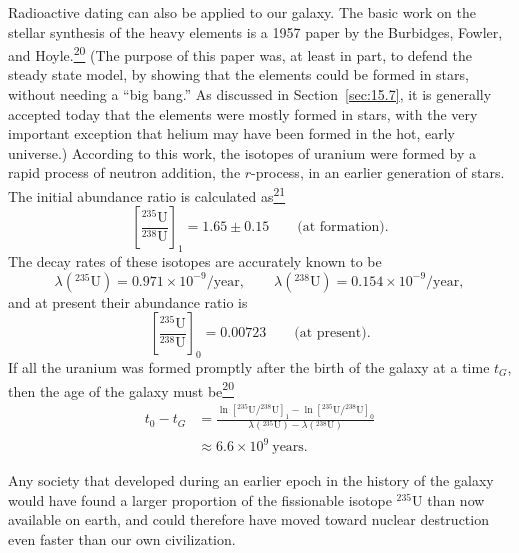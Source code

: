 Radioactive dating can also be applied to our galaxy. The basic work on the
stellar synthesis of the heavy elements is a 1957 paper by the Burbidges,
Fowler, and Hoyle.\hyperref[ch15-ref-20]{\textsuperscript{20}} (The purpose
of this paper was, at least in part, to defend the steady state model, by
showing that the elements could be formed in stars, without needing a ``big
bang.'' As discussed in Section~\ref{sec:15.7}, it is generally accepted
today that the elements were mostly formed in stars, with the very important
exception that helium may have been formed in the hot, early universe.)
According to this work, the isotopes of uranium were formed by a rapid process
of neutron addition, the \(r\)-process, in an earlier generation of stars.
The initial abundance ratio is
calculated as\hyperref[ch15-ref-21]{\textsuperscript{21}}
\[
  \left[\frac{{}^{235}\mathrm U}{{}^{238}\mathrm U}\right]_1
  =
  1.65\pm0.15
  \qquad\text{(at formation)}.
\]
The decay rates of these isotopes are accurately known to be
\[
  \lambda({}^{235}\mathrm U)
  =0.971\times10^{-9}/\text{year},
  \qquad
  \lambda({}^{238}\mathrm U)
  =0.154\times10^{-9}/\text{year},
\]
and at present their abundance ratio is
\[
  \left[\frac{{}^{235}\mathrm U}{{}^{238}\mathrm U}\right]_0
  =
  0.00723
  \qquad\text{(at present)}.
\]
If all the uranium was formed promptly after the birth of the galaxy at a time
\(t_G\), then the age of the galaxy must
be\hyperref[ch15-ref-20]{\textsuperscript{20}}
\[
  \begin{aligned}
  t_0-t_G
  &=
  \frac{
    \ln[{}^{235}\mathrm U/{}^{238}\mathrm U]_1
    -\ln[{}^{235}\mathrm U/{}^{238}\mathrm U]_0
  }{
    \lambda({}^{235}\mathrm U)-\lambda({}^{238}\mathrm U)
  }\\
  &\approx6.6\times10^9\ \text{years}.
  \end{aligned}
\]

Any society that developed during an earlier epoch in the history of the
galaxy would have found a larger proportion of the fissionable isotope
\({}^{235}\mathrm U\) than now available on earth, and could therefore have
moved toward nuclear destruction even faster than our own civilization.

